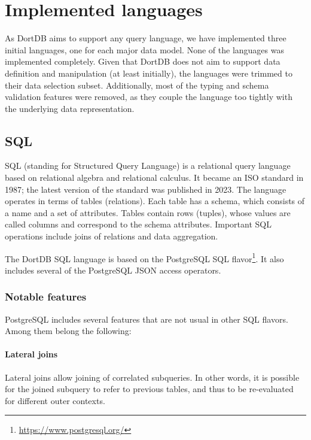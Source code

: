 \chapter{Implemented languages}
\label{chap:implemented-langs}

As DortDB aims to support any query language, we have implemented three initial languages, one for each major data model. None of the languages was implemented completely. Given that DortDB does not aim to support data definition and manipulation (at least initially), the languages were trimmed to their data selection subset. Additionally, most of the typing and schema validation features were removed, as they couple the language too tightly with the underlying data representation.

\section{SQL}

SQL (standing for Structured Query Language) is a relational query language based on relational algebra and relational calculus. It became an ISO standard in 1987; the latest version of the standard was published in 2023\cite{sql_iso_2023}. The language operates in terms of tables (relations). Each table has a schema, which consists of a name and a set of attributes. Tables contain rows (tuples), whose values are called columns and correspond to the schema attributes. Important SQL operations include joins of relations and data aggregation.

The DortDB SQL language is based on the PostgreSQL SQL flavor\footnote{\url{https://www.postgresql.org/}}. It also includes several of the PostgreSQL JSON access operators.

\subsection{Notable features}

PostgreSQL includes several features that are not usual in other SQL flavors. Among them belong the following:

\subsubsection*{Lateral joins}

Lateral joins allow joining of correlated subqueries. In other words, it is possible for the joined subquery to refer to previous tables, and thus to be re-evaluated for different outer contexts.

